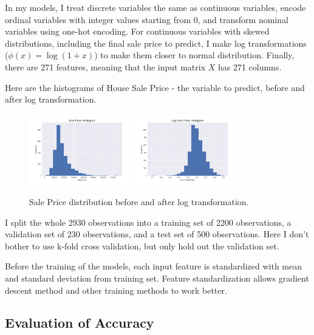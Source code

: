 \documentclass[a4paper]{article}
\begin{document}
In my models, I treat discrete variables the same as continuous variables, encode ordinal variables with integer values starting from 0, and transform nominal variables using one-hot encoding. For continuous variables with skewed distributions, including the final sale price to predict, I make log transformations ($\phi(x) = \log(1+x)$) to make them closer to normal distribution. Finally, there are 271 features, meaning that the input matrix $X$ has 271 columns.

Here are the histograms of House Sale Price - the variable to predict, before and after log transformation.
\begin{figure}[H]
\centering
\includegraphics[width=0.4\textwidth]{sale_price_hist.png}
\includegraphics[width=0.4\textwidth]{log_sale_price_hist.png}
\caption{Sale Price distribution before and after log transformation.}
\end{figure}

I split the whole 2930 observations into a training set of 2200 observations, a validation set of 230 observations, and a test set of 500 observations. Here I don't bother to use k-fold cross validation, but only hold out the validation set. 

Before the training of the models, each input feature is standardized with mean and standard deviation from training set. Feature standardization allows gradient descent method and other training methods to work better. 

\subsection{Evaluation of Accuracy}
\end{document}
